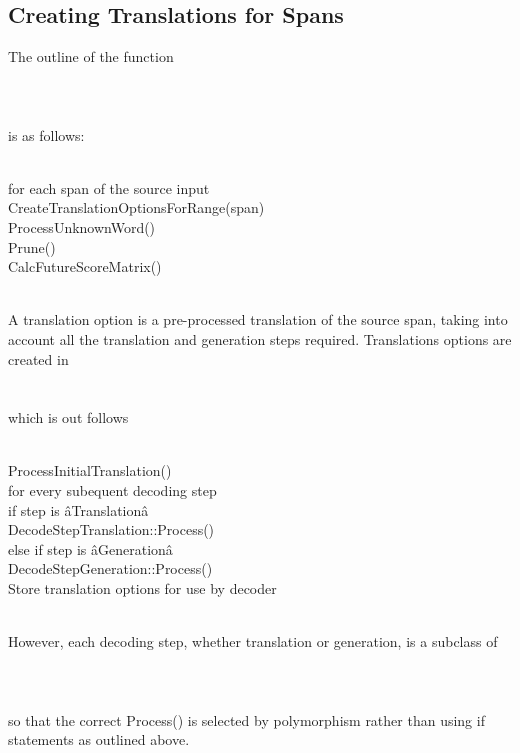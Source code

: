 \documentclass[10pt]{report}
\theoremstyle{plain}
\begin{document}
{\subsection{Creating Translations for Spans}
The outline of the function \\
\\
\\
\\
is as follows:\\
\\
\begin{tt}
\indent	for each span of the source input\\
\indent \indent	CreateTranslationOptionsForRange(span)\\
\indent	ProcessUnknownWord()\\
\indent	Prune()\\
\indent	CalcFutureScoreMatrix()\\
\end{tt}
\\
A translation option is a pre-processed translation of the source span, taking into account all the translation and generation steps required. Translations options are created in\\
\\
\\
which is out follows\\
\\
\begin{tt}
\indent	ProcessInitialTranslation()\\
\indent	for every subequent decoding step\\
\indent \indent	if step is âTranslationâ\\
\indent \indent \indent	DecodeStepTranslation::Process()\\
\indent \indent else if step is âGenerationâ\\
\indent \indent \indent DecodeStepGeneration::Process()\\
\indent Store translation options for use by decoder\\
\end{tt}
\\
However, each decoding step, whether translation or generation, is a subclass of\\
\\
\\
\\
so that the correct Process() is selected by polymorphism rather than using if statements as outlined above.
}
\end{document}
